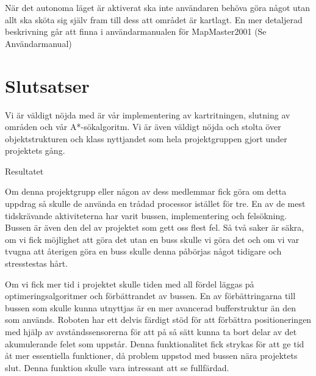 \documentclass[a4paper,12pt,fleqn]{article}
\begin{document}
När det autonoma läget är aktiverat ska inte användaren behöva göra något utan allt ska sköta sig själv fram till dess att området är kartlagt. En mer detaljerad beskrivning går att finna i användarmanualen för MapMaster2001 (Se Användarmanual)




\section{Slutsatser}




Vi är väldigt nöjda med är vår implementering av kartritningen, slutning av områden och vår A*-sökalgoritm. Vi är även väldigt nöjda och stolta över objektstrukturen och klass nyttjandet som hela projektgruppen gjort under projektets gång.

Resultatet 



Om denna projektgrupp eller någon av dess medlemmar fick göra om detta uppdrag så skulle de använda en trådad processor istället för tre. En av de mest tidskrävande aktiviteterna har varit bussen, implementering och felsökning. Bussen är även den del av projektet som gett oss flest fel. Så två saker är säkra, om vi fick möjlighet att göra det utan en buss skulle vi göra det och om vi var tvugna att återigen göra en buss skulle denna påbörjas något tidigare och stresstestas hårt.


Om vi fick mer tid i projektet skulle tiden med all fördel läggas på optimeringsalgoritmer och förbättrandet av bussen. En av förbättringarna till bussen som skulle kunna utnyttjas är en mer avancerad bufferstruktur än den som används.
Roboten har ett delvis färdigt stöd för att förbättra positioneringen med hjälp av avståndssensorerna för att på så sätt kunna ta bort delar av det akumulerande felet som uppstår. Denna funktionalitet fick strykas för att ge tid åt mer essentiella funktioner, då problem uppstod med bussen nära projektets slut. Denna funktion skulle vara intressant att se fullfärdad.  
\end{document}
